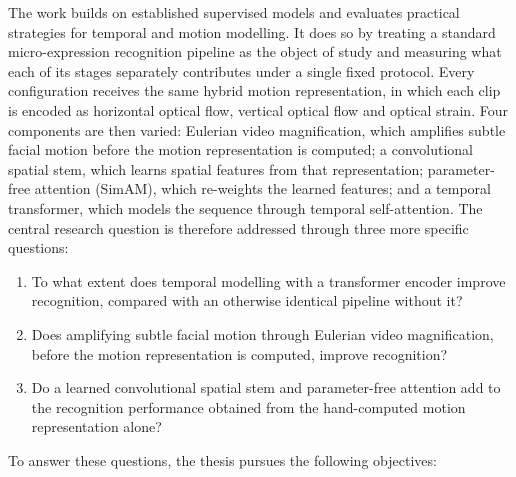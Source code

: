 The work builds on established supervised models and evaluates practical strategies for temporal and motion modelling. It does so by treating a standard micro-expression recognition pipeline as the object of study and measuring what each of its stages separately contributes under a single fixed protocol. Every configuration receives the same hybrid motion representation, in which each clip is encoded as horizontal optical flow, vertical optical flow and optical strain. Four components are then varied: Eulerian video magnification, which amplifies subtle facial motion before the motion representation is computed; a convolutional spatial stem, which learns spatial features from that representation; parameter-free attention (SimAM), which re-weights the learned features; and a temporal transformer, which models the sequence through temporal self-attention. The central research question is therefore addressed through three more specific questions:

\begin{enumerate}
	\item To what extent does temporal modelling with a transformer encoder improve recognition, compared with an otherwise identical pipeline without it?
	\item Does amplifying subtle facial motion through Eulerian video magnification, before the motion representation is computed, improve recognition?
	\item Do a learned convolutional spatial stem and parameter-free attention add to the recognition performance obtained from the hand-computed motion representation alone?
\end{enumerate}

To answer these questions, the thesis pursues the following objectives:

